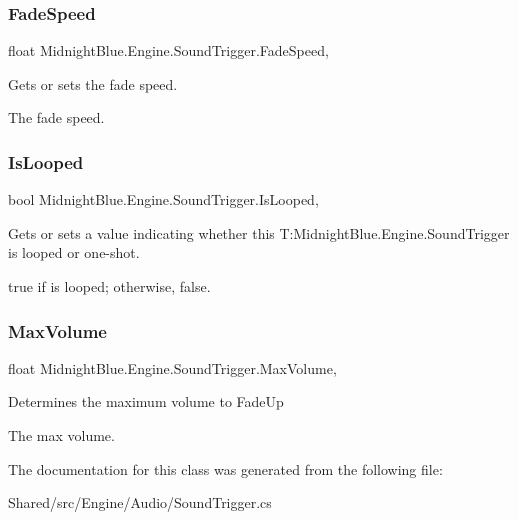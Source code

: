 \subsubsection{\texorpdfstring{Fade\+Speed}{FadeSpeed}}
{\footnotesize\ttfamily float Midnight\+Blue.\+Engine.\+Sound\+Trigger.\+Fade\+Speed\hspace{0.3cm}{\ttfamily [get]}, {\ttfamily [set]}}



Gets or sets the fade speed. 

The fade speed.\hypertarget{class_midnight_blue_1_1_engine_1_1_sound_trigger_afbbf5dade4ec346ee419b00083b540b7}{}\label{class_midnight_blue_1_1_engine_1_1_sound_trigger_afbbf5dade4ec346ee419b00083b540b7} 
\subsubsection{\texorpdfstring{Is\+Looped}{IsLooped}}
{\footnotesize\ttfamily bool Midnight\+Blue.\+Engine.\+Sound\+Trigger.\+Is\+Looped\hspace{0.3cm}{\ttfamily [get]}, {\ttfamily [set]}}



Gets or sets a value indicating whether this T\+:\+Midnight\+Blue.\+Engine.\+Sound\+Trigger is looped or one-\/shot. 

{\ttfamily true} if is looped; otherwise, {\ttfamily false}.\hypertarget{class_midnight_blue_1_1_engine_1_1_sound_trigger_a06ed16768f70795a6b89e94deb89835b}{}\label{class_midnight_blue_1_1_engine_1_1_sound_trigger_a06ed16768f70795a6b89e94deb89835b} 
\subsubsection{\texorpdfstring{Max\+Volume}{MaxVolume}}
{\footnotesize\ttfamily float Midnight\+Blue.\+Engine.\+Sound\+Trigger.\+Max\+Volume\hspace{0.3cm}{\ttfamily [get]}, {\ttfamily [set]}}



Determines the maximum volume to Fade\+Up 

The max volume.

The documentation for this class was generated from the following file\+:\begin{DoxyCompactItemize}
\item 
Shared/src/\+Engine/\+Audio/Sound\+Trigger.\+cs\end{DoxyCompactItemize}
